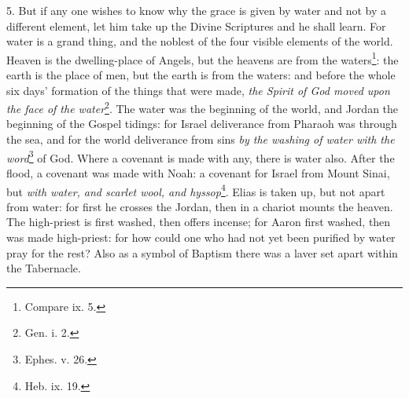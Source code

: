 5. But if any one wishes to know why the grace is given by water and not by a different element, let him take up the Divine Scriptures and he shall learn. For water is a grand thing, and the noblest of the four visible elements of the world. Heaven is the dwelling-place of Angels, but the heavens are from the waters\footnote{Compare ix. 5.}: the earth is the place of men, but the earth is from the waters: and before the whole six days’ formation of the things that were made, \emph{the Spirit of God moved upon the face of the water}\footnote{Gen. i. 2.}. The water was the beginning of the world, and Jordan the beginning of the Gospel tidings: for Israel deliverance from Pharaoh was through the sea, and for the world deliverance from sins \emph{by the washing of water with the word}\footnote{Ephes. v. 26.} of God. Where a covenant is made with any, there is water also. After the flood, a covenant was made with Noah: a covenant for Israel from Mount Sinai, but \emph{with water, and scarlet wool, and hyssop}\footnote{Heb. ix. 19.}. Elias is taken up, but not apart from water: for first he crosses the Jordan, then in a chariot mounts the heaven. The high-priest is first washed, then offers incense; for Aaron first washed, then was made high-priest: for how could one who had not yet been purified by water pray for the rest? Also as a symbol of Baptism there was a laver set apart within the Tabernacle.

